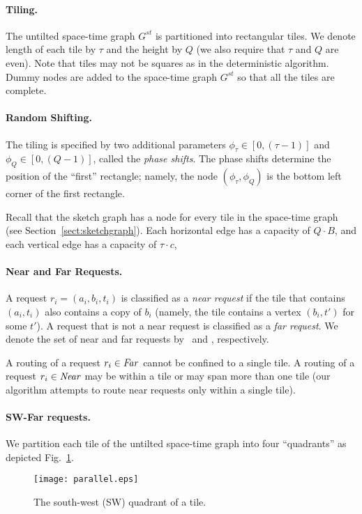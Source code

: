 \documentclass[11pt]{article}
\newenvironment{proof sketch}[1]{\noindent {\emph{Proof sketch of #1:}}}{\hfill \qed}
\newcommand{\far}{\text{\emph{Far}}}
\newcommand{\near}{\text{\emph{Near}}}
\newcommand{\hl}{\tau}
\newcommand{\vl}{Q}
\begin{document}
\paragraph{Tiling.}
The untilted space-time graph $G^{st}$ is partitioned into rectangular
tiles.  We denote length of each tile by $\hl$ and the height by $\vl$
(we also require that $\hl$ and $\vl$ are even).  Note that tiles may
not be squares as in the deterministic algorithm.  Dummy nodes are
added to the space-time graph $G^{st}$ so that all the tiles are
complete.

\paragraph{Random Shifting.}
The tiling is specified by two additional parameters $\phi_{\hl}\in [0,(\hl-1)]$ and $\phi_{\vl}\in [0,(\vl-1)]$, called the \emph{phase shifts}.  The phase shifts determine the position of the ``first'' rectangle; namely, the node $(\phi_{\hl},\phi_{\vl})$ is the bottom left corner of the first rectangle.

\medskip\noindent
Recall that the sketch graph has a node for every tile in the space-time graph (see
Section~\ref{sect:sketchgraph}).
Each horizontal edge has a capacity of $\vl\cdot B$, and
each vertical edge has a capacity of $\hl \cdot c$,

\paragraph{Near and Far Requests.}
A request $r_i=(a_i,b_i,t_i)$ is classified as a \emph{near request} if the tile that
contains $(a_i,t_i)$ also contains a copy of $b_i$ (namely, the tile contains a
vertex $(b_i,t')$ for some $t'$). A request that is not a near request is classified
as a \emph{far request}. We denote the set of near and far requests by \near\ and
\far, respectively.

A routing of a request $r_i\in \far$ cannot be confined to a single tile. A
routing of a request $r_i \in \near$ may be within a tile or may span more than one
tile (our algorithm attempts to route near requests only within a single tile).

\paragraph{SW-Far requests.}
We partition each tile of the untilted space-time graph into four ``quadrants'' as depicted
Fig.~\ref{fig:quad}.
\begin{figure}[h]
  \centering
    \texttt{[image: parallel.eps]}
  \caption{The south-west (SW) quadrant of a tile.}
\label{fig:quad}
\end{figure}
\end{document}
